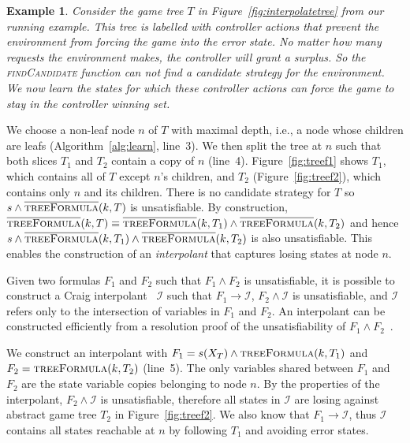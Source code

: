 \documentclass{llncs}
\newcommand{\textoverline}[1]{$\overline{\mbox{#1}}$}
\newtheorem*{exmp}{Example}
\begin{document}
\begin{exmp}

    Consider the game tree $T$ in Figure~\ref{fig:interpolatetree} from our
    running example.  This tree is labelled with controller actions that
    prevent the environment from forcing the game into the error state. No
    matter how many requests the environment makes, the controller will grant a
    surplus. So the \textsc{findCandidate} function can not find a candidate
    strategy for the environment.  We now learn the states for which these
    controller actions can force the game to stay in the controller winning
    set.

\end{exmp}

We choose a non-leaf node $n$ of $T$ with maximal depth, i.e., a node whose
children are leafs (Algorithm~\ref{alg:learn}, line~3). We then split the tree
at $n$ such that both slices $T_1$ and $T_2$ contain a copy of $n$ (line~4).
Figure~\ref{fig:treef1} shows $T_1$, which contains all of $T$ except $n$'s
children, and $T_2$ (Figure~\ref{fig:treef2}), which contains only $n$ and its
children.  There is no candidate strategy for $T$ so $s \land
\textsc{\textoverline{treeFormula}}(k, T)$ is unsatisfiable.  By construction,
$\textsc{\textoverline{treeFormula}}(k, T) \equiv
\textsc{\textoverline{treeFormula}}(k, T_1) \land
\textsc{\textoverline{treeFormula}}(k, T_2)$ and hence $s \land
\textsc{\textoverline{treeFormula}}(k, T_1) \land
\textsc{\textoverline{treeFormula}}(k, T_2)$ is also unsatisfiable. This enables
the construction of an \emph{interpolant} that captures losing states at node
$n$.

Given two formulas $F_1$ and $F_2$ such that $F_1 \land F_2$ is unsatisfiable,
it is possible to construct a Craig interpolant~\cite{craig1957} $\mathcal{I}$
such that $F_1 \to \mathcal{I}$, $F_2 \land \mathcal{I}$ is unsatisfiable, and
$\mathcal{I}$ refers only to the intersection of variables in $F_1$ and $F_2$.
An interpolant can be constructed efficiently from a resolution proof of the
unsatisfiability of $F_1 \land F_2$~\cite{pudlak1997}.

We construct an interpolant with $F_1 = s(X_T) \land \textsc{treeFormula}(k, T_1)$
and $F_2 = \textsc{treeFormula}(k, T_2)$ (line~5). The only variables shared between $F_1$
and $F_2$ are the state variable copies belonging to node $n$. By the properties of the interpolant,
$F_2 \land \mathcal{I}$ is unsatisfiable, therefore all states in $\mathcal{I}$
are losing against abstract game tree $T_2$ in Figure~\ref{fig:treef2}.  We also know that $F_1 \to
\mathcal{I}$, thus $\mathcal{I}$ contains all states reachable at $n$ by
following $T_1$ and avoiding error states. 
\end{document}
